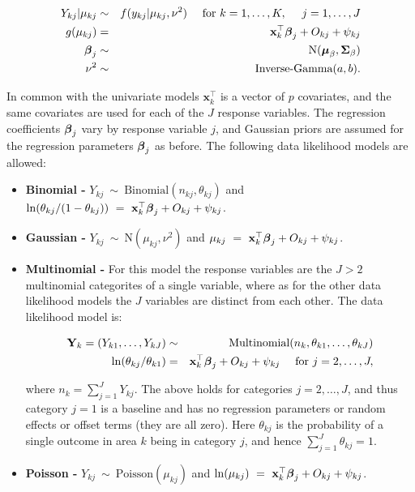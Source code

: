 \documentclass[article,shortnames,nojss]{jss}
\newcommand{\bd}[1]{\ensuremath{\mbox{\boldmath $#1$}}}
\begin{document}
\begin{eqnarray}
Y_{kj}|\mu_{kj}&\sim&f(y_{kj}|\mu_{kj}, \nu^2)~~~~\mbox{for }k=1,\ldots,K,~~~~ j=1,\ldots,J\label{equation MV likelihood}\\
g(\mu_{kj})&=& \mathbf{x}_{k}^{\top}\bd{\beta}_j + O_{kj} + \psi_{kj} \nonumber\\
\bd{\beta}_j&\sim&\mbox{N}(\bd{\mu}_{\beta}, \bd{\Sigma}_{\beta})\nonumber\\
\nu^2 &\sim& \mbox{Inverse-Gamma}(a,b).\nonumber
\end{eqnarray}

In common with the univariate models $\mathbf{x}_{k}^{\top}$ is a vector of $p$ covariates, and the same covariates are used for each of the $J$ response variables. The regression coefficients $\bd{\beta}_j$ vary by response variable $j$, and Gaussian priors are assumed for the regression parameters $\bd{\beta}_j$ as before. The following data likelihood models are allowed:

\begin{itemize}
\item \textbf{Binomial - } $Y_{kj}~\sim~\mbox{Binomial}(n_{kj}, \theta_{kj})$ and $\ln(\theta_{kj}/(1-\theta_{kj}))~=~\mathbf{x}_{k}^{\top}\bd{\beta}_j + O_{kj} + \psi_{kj}$. 

\item \textbf{Gaussian - } $Y_{kj}~\sim~\mbox{N}(\mu_{kj}, \nu^2)$ and $\mu_{kj}~=~\mathbf{x}_{k}^{\top}\bd{\beta}_j + O_{kj} + \psi_{kj}$.\\


\item \textbf{Multinomial - } For this model the response variables are the $J>2$ multinomial categorites of a single variable, where as for the other data likelihood models the $J$ variables are distinct from each other. The data likelihood model is:

\begin{eqnarray}
\mathbf{Y}_k=(Y_{k1},\ldots, Y_{kJ})&\sim&\mbox{Multinomial}(n_{k}, \theta_{k1},\ldots,\theta_{kJ})\nonumber\\
\ln(\theta_{kj}/\theta_{k1})&=&\mathbf{x}_{k}^{\top}\bd{\beta}_j + O_{kj} + \psi_{kj}~~~~\mbox{for }j=2,\ldots,J,\nonumber
\end{eqnarray}

where $n_k=\sum_{j=1}^{J}Y_{kj}$. The above holds for categories $j=2,\ldots,J$, and thus category $j=1$ is a baseline and has no regression parameters or random effects or offset terms (they are all zero). Here $\theta_{kj}$ is the probability of a single outcome in area $k$ being in category $j$, and hence $\sum_{j=1}^{J}\theta_{kj}=1$.

\item \textbf{Poisson - } $Y_{kj}~\sim~\mbox{Poisson}(\mu_{kj})$ and $\ln(\mu_{kj})~=~\mathbf{x}_{k}^{\top}\bd{\beta}_j + O_{kj} + \psi_{kj}$. 
\end{itemize}
\end{document}
